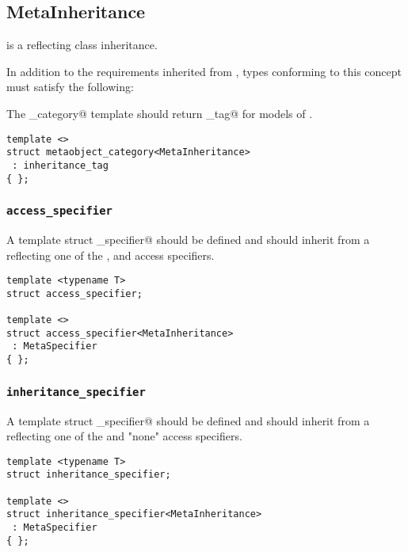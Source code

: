 \subsection{MetaInheritance}
\label{concept-MetaInheritance}


 is a  reflecting class inheritance.

In addition to the requirements inherited from , types conforming to this concept
must satisfy the following:

The \verb@metaobject_category@ template should return \verb@inheritance_tag@ for models
of .

\begin{verbatim}
template <>
struct metaobject_category<MetaInheritance>
 : inheritance_tag
{ };
\end{verbatim}

\subsubsection{\texttt{access\_specifier}}

A template struct \verb@access_specifier@ should be defined and should inherit from
a  reflecting one of the \verb@private@, \verb@protected@ and
\verb@public@ access specifiers.

\begin{verbatim}
template <typename T>
struct access_specifier;

template <>
struct access_specifier<MetaInheritance>
 : MetaSpecifier
{ };
\end{verbatim}

\subsubsection{\texttt{inheritance\_specifier}}

A template struct \verb@inheritance_specifier@ should be defined and should inherit from
a  reflecting one of the \verb@virtual@ and "none" access specifiers.

\begin{verbatim}
template <typename T>
struct inheritance_specifier;

template <>
struct inheritance_specifier<MetaInheritance>
 : MetaSpecifier
{ };
\end{verbatim}

